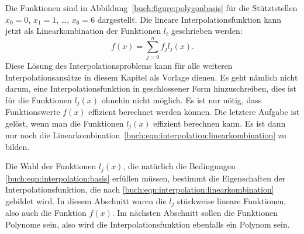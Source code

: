 Die Funktionen sind in Abbildung~\ref{buch:figure:polygonbasis} für
die Stütztstellen $x_0=0$, $x_1=1$, \dots , $x_6=6$ dargestellt.
Die lineare Interpolationsfunktion kann jetzt als Linearkombination
der Funktionen $l_i$ geschrieben werden:
\begin{equation}
f(x)
=
\sum_{j=0}^n f_j l_j(x).
\label{buch:eqn:interpolation:linearkombination}
\end{equation}
Diese Lösung des Interpolationsproblems kann für alle weiteren
Interpolationsansätze in diesem Kapitel als Vorlage dienen.
Es geht nämlich nicht darum, eine Interpolationsfunktion in
geschlossener Form hinzuschreiben, dies ist für die Funktionen $l_j(x)$
ohnehin nicht möglich.
Es ist nur nötig, dass Funktionswerte $f(x)$ effizient berechnet
werden können.
Die letztere Aufgabe ist gelöst, wenn man die Funktionen $l_j(x)$
effizient berechnen kann.
Es ist dann nur noch die
Linearkombination~\eqref{buch:eqn:interpolation:linearkombination}
zu bilden.

Die Wahl der Funktionen $l_j(x)$, die natürlich die Bedingungen
\eqref{buch:eqn:interpolation:basis} erfüllen müssen,
bestimmt die Eigenschaften der
Interpolationsfunktion, die nach 
\eqref{buch:eqn:interpolation:linearkombination}
gebildet wird.
In diesem Abschnitt waren die $l_j$ stückweise lineare Funktionen,
also auch die Funktion $f(x)$.
Im nächsten Abschnitt sollen die Funktionen Polynome sein,
also wird die Interpolationsfunktion ebenfalls ein Polynom sein.







